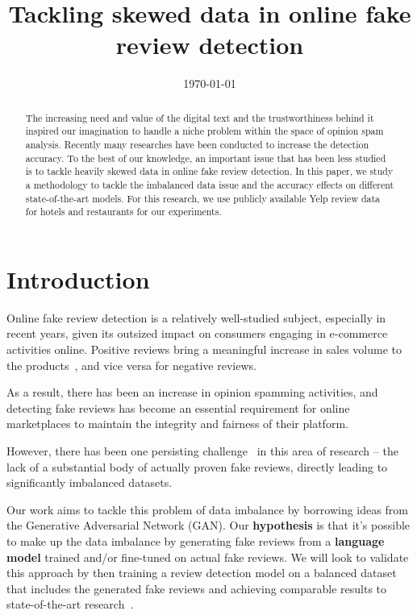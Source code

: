 \documentclass[conference, 11pt]{IEEEtran} %
\title{Tackling skewed data in online fake review detection}
\date{\today}
\author{\IEEEauthorblockN{Satheesh Joseph}
\IEEEauthorblockA{satheeshrishi@berkeley.edu}
\and
\IEEEauthorblockN{Catherine Mou}
\IEEEauthorblockA{catherine041616@berkeley.edu}
\and
\IEEEauthorblockN{Yi Zhang}
\IEEEauthorblockA{yizhang7210@berkeley.edu}
}
\theoremstyle{plain}
\theoremstyle{definition}
\begin{document}
\maketitle



\begin{abstract}
The increasing need and value of the digital text and the trustworthiness behind it inspired our imagination to handle a niche problem within the space of opinion spam analysis. Recently many researches have been conducted to increase the detection accuracy. To the best of our knowledge, an important issue that has been less studied is to tackle heavily skewed data in online fake review detection. In this paper, we study a methodology to tackle the imbalanced data issue and the accuracy effects on different state-of-the-art models. For this research, we use publicly available Yelp review data for hotels and restaurants for our experiments.
\end{abstract}

\section{Introduction}
\label{intro}
Online fake review detection is a relatively well-studied subject, especially in recent years, given its outsized impact on consumers engaging in e-commerce activities online. Positive reviews bring a meaningful increase in sales volume to the products~\cite{ho2013effects}, and vice versa for negative reviews.

As a result, there has been an increase in opinion spamming activities, and detecting fake reviews has become an essential requirement for online marketplaces to maintain the integrity and fairness of their platform.

However, there has been one persisting challenge~\cite{stanton2019gans, Tang2020, wang2020fake, yuan2019learning} in this area of research -- the lack of a substantial body of actually proven fake reviews, directly leading to significantly imbalanced datasets.

Our work aims to tackle this problem of data imbalance by borrowing ideas from the Generative Adversarial Network (GAN). Our \textbf{hypothesis} is that it's possible to make up the data imbalance by generating fake reviews from a \textbf{language model} trained and/or fine-tuned on actual fake reviews. We will look to validate this approach by then training a review detection model on a balanced dataset that includes the generated fake reviews and achieving comparable results to state-of-the-art research~\cite{Tang2020}.
\end{document}
